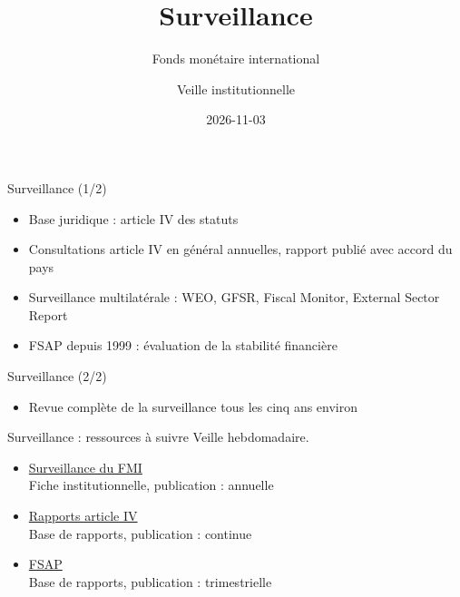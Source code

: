 \documentclass[aspectratio=169,11pt]{beamer}
\title{Surveillance}
\subtitle{Fonds monétaire international}
\author{Veille institutionnelle}
\date{2026-11-03}
\begin{document}
\begin{frame}\titlepage\end{frame}

\begin{frame}{Surveillance (1/2)}
\begin{itemize}
\item Base juridique : article IV des statuts
\item Consultations article IV en général annuelles, rapport publié avec accord du pays
\item Surveillance multilatérale : WEO, GFSR, Fiscal Monitor, External Sector Report
\item FSAP depuis 1999 : évaluation de la stabilité financière
\end{itemize}
\end{frame}

\begin{frame}{Surveillance (2/2)}
\begin{itemize}
\item Revue complète de la surveillance tous les cinq ans environ
\end{itemize}
\end{frame}

\begin{frame}{Surveillance : ressources à suivre}
\small
Veille hebdomadaire.
\begin{itemize}
\item \href{https://www.imf.org/en/About/Factsheets/Sheets/2023/IMF-Surveillance}{Surveillance du FMI}\\{\footnotesize Fiche institutionnelle, publication : annuelle}
\item \href{https://www.imf.org/en/Publications/CR}{Rapports article IV}\\{\footnotesize Base de rapports, publication : continue}
\item \href{https://www.imf.org/en/Publications/FSAP}{FSAP}\\{\footnotesize Base de rapports, publication : trimestrielle}
\end{itemize}
\end{frame}
\end{document}
